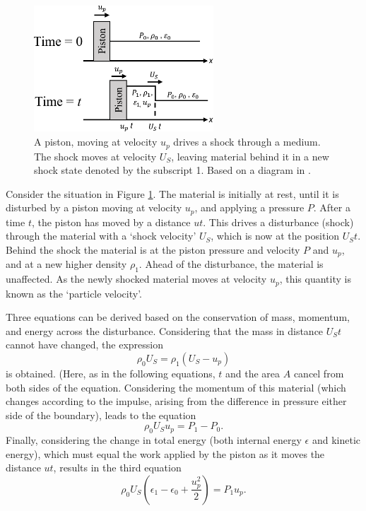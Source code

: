 \begin{figure}
\centering
\includegraphics[width=0.6\textwidth]{figures/Theory/Piston.pdf}%
\caption{\label{fig:Piston} A piston, moving at velocity $u_p$ drives a shock through a medium. The shock moves at velocity $U_S$, leaving material behind it in a new shock state denoted by the subscript 1. Based on a diagram in \cite{Zeldovich1966}.}
\end{figure}

Consider the situation in Figure \ref{fig:Piston}. The material is initially at rest, until it is disturbed by a piston moving at velocity $u_p$, and applying a pressure $P$. After a time $t$, the piston has moved by a distance $ut$. This drives a disturbance (shock) through the material with a `shock velocity' $U_S$, which is now at the position $U_S t$. Behind the shock the material is at the piston pressure and velocity $P$ and $u_p$, and at a new higher density $\rho_1$. Ahead of the disturbance, the material is unaffected. As the newly shocked material moves at velocity $u_p$, this quantity is known as the `particle velocity'.

Three equations can be derived based on the conservation of mass, momentum, and energy across the disturbance. Considering that the mass in distance $U_S t$ cannot have changed, the expression
\begin{equation} \rho_0 U_S = \rho_1 (U_S - u_p) \end{equation}
is obtained. (Here, as in the following equations, $t$ and the area $A$ cancel from both sides of the equation. Considering the momentum of this material (which changes according to the impulse, arising from the difference in pressure either side of the boundary), leads to the equation 
\begin{equation} \rho_0 U_S u_p = P_1 - P_0. \end{equation}
Finally, considering the change in total energy (both internal energy $\epsilon$ and kinetic energy), which must equal the work applied by the piston as it moves the distance $ut$, results in the third equation 
\begin{equation} \rho_0 U_S (\epsilon_1 - \epsilon_0 + \frac{u_p^2}{2}) = P_1 u_p. \end{equation}

